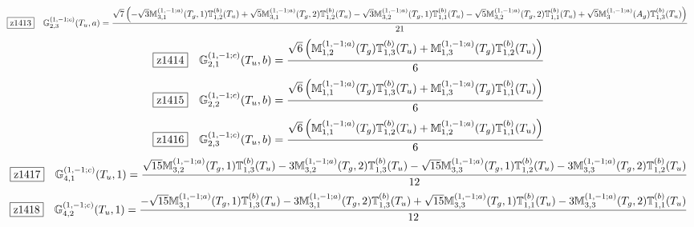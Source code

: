 \documentclass[fleqn,10pt,landscape]{jsarticle}
\begin{document}
\begin{dmath*}
\hspace*{3mm}\fbox{z1413}\quad \mathbb{G}_{2,3}^{(1,-1;c)}(T_{u},a)=\frac{\sqrt{7} \left(- \sqrt{3} \mathbb{M}_{3,1}^{(1,-1;a)}(T_{g},1) \mathbb{T}_{1,2}^{(b)}(T_{u}) + \sqrt{5} \mathbb{M}_{3,1}^{(1,-1;a)}(T_{g},2) \mathbb{T}_{1,2}^{(b)}(T_{u}) - \sqrt{3} \mathbb{M}_{3,2}^{(1,-1;a)}(T_{g},1) \mathbb{T}_{1,1}^{(b)}(T_{u}) - \sqrt{5} \mathbb{M}_{3,2}^{(1,-1;a)}(T_{g},2) \mathbb{T}_{1,1}^{(b)}(T_{u}) + \sqrt{5} \mathbb{M}_{3}^{(1,-1;a)}(A_{g}) \mathbb{T}_{1,3}^{(b)}(T_{u})\right)}{21}
\end{dmath*}
\begin{dmath*}
\hspace*{3mm}\fbox{z1414}\quad \mathbb{G}_{2,1}^{(1,-1;c)}(T_{u},b)=\frac{\sqrt{6} \left(\mathbb{M}_{1,2}^{(1,-1;a)}(T_{g}) \mathbb{T}_{1,3}^{(b)}(T_{u}) + \mathbb{M}_{1,3}^{(1,-1;a)}(T_{g}) \mathbb{T}_{1,2}^{(b)}(T_{u})\right)}{6}
\end{dmath*}
\begin{dmath*}
\hspace*{3mm}\fbox{z1415}\quad \mathbb{G}_{2,2}^{(1,-1;c)}(T_{u},b)=\frac{\sqrt{6} \left(\mathbb{M}_{1,1}^{(1,-1;a)}(T_{g}) \mathbb{T}_{1,3}^{(b)}(T_{u}) + \mathbb{M}_{1,3}^{(1,-1;a)}(T_{g}) \mathbb{T}_{1,1}^{(b)}(T_{u})\right)}{6}
\end{dmath*}
\begin{dmath*}
\hspace*{3mm}\fbox{z1416}\quad \mathbb{G}_{2,3}^{(1,-1;c)}(T_{u},b)=\frac{\sqrt{6} \left(\mathbb{M}_{1,1}^{(1,-1;a)}(T_{g}) \mathbb{T}_{1,2}^{(b)}(T_{u}) + \mathbb{M}_{1,2}^{(1,-1;a)}(T_{g}) \mathbb{T}_{1,1}^{(b)}(T_{u})\right)}{6}
\end{dmath*}
\begin{dmath*}
\hspace*{3mm}\fbox{z1417}\quad \mathbb{G}_{4,1}^{(1,-1;c)}(T_{u},1)=\frac{\sqrt{15} \mathbb{M}_{3,2}^{(1,-1;a)}(T_{g},1) \mathbb{T}_{1,3}^{(b)}(T_{u}) - 3 \mathbb{M}_{3,2}^{(1,-1;a)}(T_{g},2) \mathbb{T}_{1,3}^{(b)}(T_{u}) - \sqrt{15} \mathbb{M}_{3,3}^{(1,-1;a)}(T_{g},1) \mathbb{T}_{1,2}^{(b)}(T_{u}) - 3 \mathbb{M}_{3,3}^{(1,-1;a)}(T_{g},2) \mathbb{T}_{1,2}^{(b)}(T_{u})}{12}
\end{dmath*}
\begin{dmath*}
\hspace*{3mm}\fbox{z1418}\quad \mathbb{G}_{4,2}^{(1,-1;c)}(T_{u},1)=\frac{- \sqrt{15} \mathbb{M}_{3,1}^{(1,-1;a)}(T_{g},1) \mathbb{T}_{1,3}^{(b)}(T_{u}) - 3 \mathbb{M}_{3,1}^{(1,-1;a)}(T_{g},2) \mathbb{T}_{1,3}^{(b)}(T_{u}) + \sqrt{15} \mathbb{M}_{3,3}^{(1,-1;a)}(T_{g},1) \mathbb{T}_{1,1}^{(b)}(T_{u}) - 3 \mathbb{M}_{3,3}^{(1,-1;a)}(T_{g},2) \mathbb{T}_{1,1}^{(b)}(T_{u})}{12}
\end{dmath*}
\end{document}
